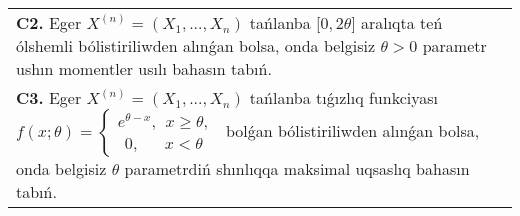 \documentclass{article}
\begin{document}
\begin{tabular}{m{17cm}}
 \\
\textbf{C2.} 
Eger \(X^{(n)} = \left( X_{1},...,X_{n} \right)\) tańlanba {[}\(0,2\theta\rbrack\) aralıqta teń ólshemli bólistiriliwden alınǵan bolsa, onda belgisiz \(\theta > 0\) parametr ushın momentler usılı bahasın tabıń.
 \\
\textbf{C3.} 
Eger \(X^{(n)} = \left( X_{1},...,X_{n} \right)\) tańlanba tıǵızlıq funkciyası
$f(x;\theta) = \left\{ \begin{matrix}
e^{\theta - x},\ \ x \geq \theta, \\
\ \ 0,\ \ \ \ \ \ \ x < \theta
\end{matrix} \right.\ $
bolǵan bólistiriliwden alınǵan bolsa, onda belgisiz \(\theta\) parametrdiń shınlıqqa maksimal uqsaslıq bahasın tabıń.
 \\

\end{tabular}
\vspace{1cm}
\end{document}
